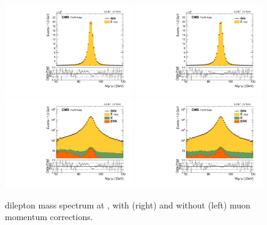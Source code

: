 \begin{figure}[htbp]
\centering
\includegraphics[width=0.49\textwidth]{plots/LepScaleSmear/plotZmm13TeV_noCorr/zmm.pdf}
\includegraphics[width=0.49\textwidth]{plots/LepScaleSmear/plotZmm13TeV_corr/zmm.pdf}
\\
\includegraphics[width=0.49\textwidth]{plots/LepScaleSmear/plotZmm13TeV_noCorr/zmmlog.pdf}
\includegraphics[width=0.49\textwidth]{plots/LepScaleSmear/plotZmm13TeV_corr/zmmlog.pdf}
\caption{\zmm dilepton mass spectrum at \sh, with (right) and without (left) muon momentum corrections.}
\label{fig:lepscale:zmm:13}
\end{figure}